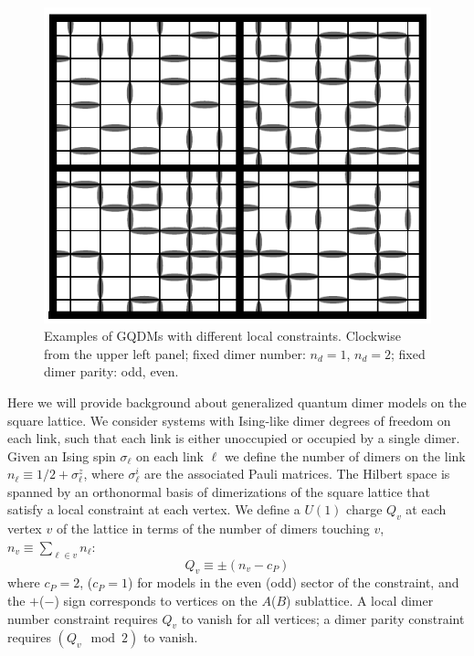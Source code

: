 \documentclass[twocolumn,prb,aps,floatfix,superscriptaddress]{revtex4-1}
\begin{document}
\begin{figure}[htpb]
    \centering
    \includegraphics[width=0.9\linewidth]{example_local_constraints.pdf}
    \caption{Examples of GQDMs with different local constraints. Clockwise from the upper left panel; fixed dimer number: $n_d=1$, $n_d=2$;  fixed dimer parity: odd, even.}
    \label{fig:example_local_constraints}
\end{figure}
Here we will provide background about generalized quantum dimer models on the square lattice. We consider systems with Ising-like dimer degrees of freedom on each link, such that each link is either unoccupied or occupied by a single dimer. Given an Ising spin $\sigma_\ell$ on each link $\ell$ we define the number of dimers on the link $n_\ell \equiv 1/2+\sigma_\ell^z$, where $\sigma_\ell^i$ are the associated Pauli matrices. The Hilbert space is spanned by an orthonormal basis of dimerizations of the square lattice that satisfy a local constraint at each vertex. We define a $U(1)$ charge $Q_v$ at each vertex $v$ of the lattice in terms of the number of dimers touching $v$, $n_v\equiv \sum_{\ell \in v}n_\ell$:
\begin{equation}
Q_v \equiv \pm \left( n_v - c_P \right)
\end{equation}
where $c_P = 2$, ($c_P=1$) for models in the even (odd) sector of the constraint, and the $+$($-$) sign corresponds to vertices on the $A$($B$) sublattice. A local dimer number constraint requires $Q_v$ to vanish for all vertices; a dimer parity constraint requires $(Q_v\mod 2)$ to vanish.
 
\end{document}
